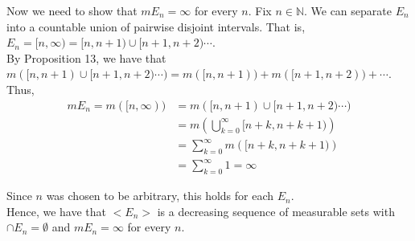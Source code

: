\documentclass[12pt]{article}
\begin{document}
Now we need to show that $mE_n = \infty$ for every $n$. Fix $n \in \mathbb{N}$. We can separate $E_n$ into a countable union of pairwise disjoint intervals. That is, $E_n = [n, \infty) = [n, n+1) \cup [n+1, n+2) \cdots$.\\

By Proposition 13, we have that $m([n, n+1) \cup [n+1, n+2) \cdots) = m([n, n+1)) + m([n+1, n+2)) + \cdots$. Thus,
\begin{align*}
mE_n = m([n, \infty)) &= m([n, n+1) \cup [n+1, n+2) \cdots)\\
&= m\left(\bigcup_{k=0}^{\infty} [n+k, n+k+1)\right)\\
&= \sum_{k=0}^{\infty} m\left([n+k, n+k+1)\right)\\
&=  \sum_{k=0}^{\infty} 1 = \infty
\end{align*}

Since $n$ was chosen to be arbitrary, this holds for each $E_n$.\\

Hence, we have that $<E_n>$ is a decreasing sequence of measurable sets with $\cap E_n = \emptyset$ and $mE_n = \infty$ for every $n$.
\end{document}
